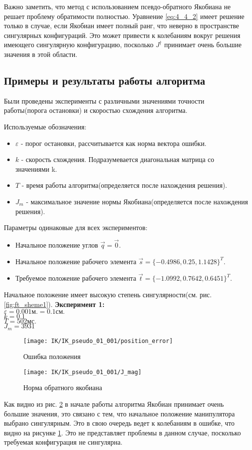 Важно заметить, что метод с использованием псевдо-обратного Якобиана не решает проблему обратимости полностью. Уравнение \ref{eq:4_4_2} имеет решение только в случае, если Якобиан имеет полный ранг, что неверно в пространстве сингулярных конфигураций. Это может привести к колебаниям вокруг решения имеющего сингулярную конфигурацию, посколько $J^{\dagger}$ принимает очень большие значения в этой области. 

\subsection{Примеры и результаты работы алгоритма}\label{subsect:4_4_1}
	Были проведены эксперименты с различными значениями точности работы(порога остановки) и скоростью схождения алгоритма.
	
	Используемые обозначения:
	\begin{itemize}
		\item $\varepsilon$ - порог остановки, рассчитывается как норма вектора ошибки.
		\item $k$ - скорость схождения. Подразумевается диагональная матрица со значениями k.
		\item $T$ - время работы алгоритма(определяется после нахождения решения).
		\item $J_{m}$ - максимальное значение нормы Якобиана(определяется после нахождения решения).
	\end{itemize}
	\bigbreak
	Параметры одинаковые для всех экспериментов:
	\begin{itemize}
		\item 	Начальное положение углов $\vec{q} = \vec{0}$.
		\item	Начальное положение рабочего элемента $\vec{s} = \{-0.4986, 0.25, 1.1428\}^{T}$.
		\item	Требуемое положение рабочего элемента $\vec{t} = \{-1.0992, 0.7642, 0.6451\}^{T}$.
	\end{itemize}
	\bigbreak
	Начальное положение имеет высокую степень сингулярности(см. рис. \ref{fig:ft_sheme1}). 
 	\bigbreak
	\textbf{Эксперимент 1:}\\
		$\varepsilon = 0.001\text{м.} = 0.1\text{см.}$\\
		$k = 0.1$\\
		$T = 502 \text{мс.}$\\
		$J_{m} = 3931$
		
		\begin{figure}[h!]
			\centering
			\texttt{[image: IK/IK\_pseudo\_01\_001/position\_error]}
			\caption{Ошибка положения}
			\label{fig:4_4_1}
		\end{figure}
		\begin{figure}[h!]
			\centering
			\texttt{[image: IK/IK\_pseudo\_01\_001/J\_mag]}
			\caption{Норма обратного якобиана}
			\label{fig:4_4_2}
		\end{figure}
		Как видно из рис. \ref{fig:4_4_2} в начале работы алгоритма Якобиан принимает очень большие значения, это связано с тем, что начальное положение манипулятора выбрано сингулярным. Это в свою очередь ведет к колебаниям в ошибке, что видно на рисунке \ref{fig:4_4_1}. Это не представляет проблемы в данном случае, посколько требуемая конфигурация не сингулярна.
		
